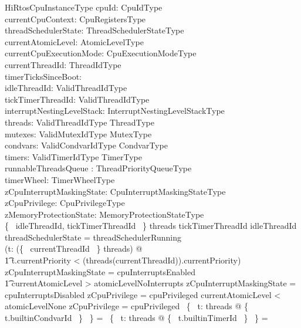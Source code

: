 \documentclass[11pt,letterpaper,twoside,openany]{book}
\begin{document}
\begin{schema}{HiRtosCpuInstanceType}
    cpuId: CpuIdType \\
    currentCpuContext: CpuRegistersType \\
    threadSchedulerState: ThreadSchedulerStateType \\
    currentAtomicLevel: AtomicLevelType \\
    currentCpuExecutionMode: CpuExecutionModeType \\
    currentThreadId: ThreadIdType \\
    timerTicksSinceBoot: \nat \\
    idleThreadId: ValidThreadIdType \\
    tickTimerThreadId: ValidThreadIdType \\
    interruptNestingLevelStack: InterruptNestingLevelStackType \\
    threads: ValidThreadIdType \finj ThreadType \\
    mutexes: ValidMutexIdType \finj MutexType \\
    condvars: ValidCondvarIdType \finj CondvarType \\
    timers: ValidTimerIdType \finj TimerType \\
    runnableThreadsQueue : ThreadPriorityQueueType \\
    timerWheel: TimerWheelType \\
    zCpuInterruptMaskingState: CpuInterruptMaskingStateType \\
    zCpuPrivilege: CpuPrivilegeType \\
    zMemoryProtectionState: MemoryProtectionStateType \\
\where
    \{~ idleThreadId, tickTimerThreadId ~\} \subseteq \dom threads
\also
    tickTimerThreadId \neq idleThreadId
\also
    threadSchedulerState = threadSchedulerRunning \implies \\
    (\forall t: \ran (\{~ currentThreadId ~\} \ndres threads) @ \\
\t1    t.currentPriority < (threads(currentThreadId)).currentPriority)
\also
    zCpuInterruptMaskingState = cpuInterruptsEnabled \iff \\
\t1 currentAtomicLevel > atomicLevelNoInterrupts
\also
    zCpuInterruptMaskingState = cpuInterruptsDisabled \implies zCpuPrivilege = cpuPrivileged
\also
    currentAtomicLevel < atomicLevelNone \implies zCpuPrivilege = cpuPrivileged
\also
    \bigcap~\{~ t: \ran threads @ \{~ t.builtinCondvarId ~\} ~\} = \emptyset
\also
    \bigcap~\{~ t: \ran threads @ \{~ t.builtinTimerId ~\} ~\} = \emptyset

\end{schema}
\end{document}
